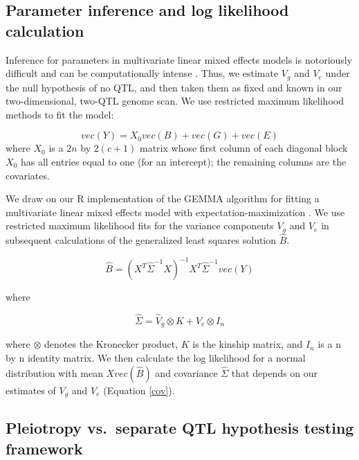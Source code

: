 \documentclass[12pt,twoside, lineno]{gsajnl}
\begin{document}
\subsection{Parameter inference and log likelihood calculation}

Inference for parameters in multivariate linear mixed effects models
is notoriously difficult and can be computationally intense
\citep{meyer1989restricted,meyer1991estimating}. Thus, we estimate
$V_g$ and $V_e$ under the null hypothesis of no QTL, and then taken
them as fixed and known in our two-dimensional, two-QTL genome scan.
We use restricted maximum likelihood methods to fit the
model:

\begin{equation}
vec(Y) = X_0vec(B) + vec(G) + vec(E)
\label{model}
\end{equation}
where $X_0$ is a $2n$ by $2(c + 1)$ matrix whose first column of each
diagonal block $X_0$ has all entries equal to one (for an intercept); the remaining
columns are the covariates.

We draw on our R implementation \citep{gemma2} of the
GEMMA algorithm for fitting a multivariate linear mixed effects model
with expectation-maximization \citep{zhou2014efficient}. We use
restricted maximum likelihood fits for the variance components $V_g$
and $V_e$ in subsequent calculations of the generalized least squares
solution $\hat B$.

\begin{equation}
    \hat B = (X^T\hat\Sigma^{-1}X)^{-1}X^T\hat\Sigma^{-1}vec(Y)
\end{equation}

\noindent where

\begin{equation}
    \hat\Sigma = \hat V_g \otimes K + \hat V_e \otimes I_n
    \label{cov}
\end{equation}

\noindent where $\otimes$ denotes the Kronecker product, $K$ is the
kinship matrix, and $I_n$ is a n by n
identity matrix. We then calculate the log likelihood for a normal
distribution with mean $X vec(\hat B)$ and covariance $\hat \Sigma$
that depends on our estimates of $V_g$ and $V_e$ (Equation \ref{cov}).

\subsection{Pleiotropy vs.\ separate QTL hypothesis testing framework}
\end{document}
